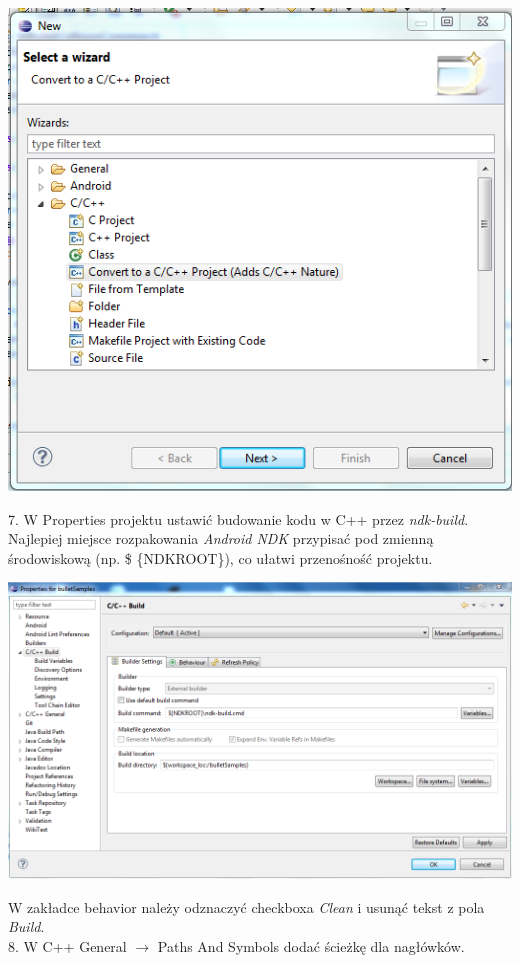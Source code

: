   \includegraphics{./img/convert.png}
  
  7. W Properties projektu ustawić budowanie kodu w C++ przez \emph{ndk-build}.
  Najlepiej miejsce rozpakowania \emph{Android NDK} przypisać pod zmienną
  środowiskową (np. \$ \{NDKROOT\}), co ułatwi przenośność projektu.
  
  \includegraphics[width=\textwidth]{./img/properties.png}
  
  W zakładce behavior należy odznaczyć checkboxa \emph{Clean} i usunąć tekst z
  pola \emph{Build}.\\
  8. W C++ General $ \rightarrow $ Paths And Symbols dodać ścieżkę dla nagłówków.
 
